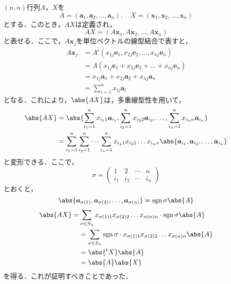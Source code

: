 \begin{tproof}
  $(n,n)$行列$A$，$X$を
  \[
    A = (\bm{a}_1 ,\bm{a}_2, \dots ,\bm{a}_n) , \quad X = (\bm{x}_1,\bm{x}_2,\dots,\bm{x}_n)
  \]
  とする．このとき，$AX$は定義され，
  \[
    AX = (A\bm{x}_1 , A\bm{x}_2 , \dots ,A\bm{x}_n)
  \]
  と表せる．ここで，$A \bm{x}_j$を単位ベクトルの線型結合で表すと，
  \begin{align*}
    A \bm{x}_j & = A {}^t (x_{1j} \bm{e}_1 , x_{2j} \bm{e}_2,\ldots ,x_{nj} \bm{e}_n ) \\
               & =A (x_{1j} \bm{e}_1 + x_{2j} \bm{e}_2+ \dots + x_{nj} \bm{e}_n)       \\
               & = x_{1j} \bm{a}_1 + x_{2j} \bm{a}_2 + x_{nj} \bm{a}_n                 \\
               & = \sum_{ i =1}^{n} x_{ij} \bm{a}_{i}
  \end{align*}
  となる．これにより，$\abs{AX}$は，多重線型性を用いて，
  \begin{align*}
    \abs{AX} & = \abs{\sum_{i_1 =1}^{n} x_{i_1 1} \bm{a}_{i_1} , \sum_{i_2 =1}^{n} x_{i_2 2} \bm{a}_{i_2},\ldots , \sum_{i_n =1}^{n} x_{i_n n} \bm{a}_{i_n} }        \\
             & = \sum_{i_1 =1}^{n} \sum_{i_2 = 1}^{n} \dots \sum_{i_n =1}^{n} x_{i_1 1} x_{i_2 2} \dots x_{i_n n} \abs{\bm{a}_{i_1},\bm{a}_{i_2},\dots,\bm{a}_{i_n}}
  \end{align*}
  と変形できる．ここで，
  \[
    \sigma = \begin{pmatrix} 1 & 2 & \cdots & n \\ i_1 & i_2 & \cdots & i_n \end{pmatrix}
  \]
  とおくと，
  \[
    \abs{\bm{a}_{\sigma (1)},\bm{a}_{\sigma(2)},\dots,\bm{a}_{\sigma(n)}} = \sgn \sigma \abs{A}
  \]
  \begin{align*}
    \abs{AX} = & \sum_{\sigma \in S_n} x_{\sigma (1)1} x_{\sigma(2)2} \dots x_{\sigma(n)n} \cdot \sgn \sigma  \abs{A}   \\
               & = \sum_{\sigma \in S_n } \sgn \sigma \cdot x_{\sigma(1)1} x_{\sigma(2)2} \dots x_{\sigma (n)n} \abs{A} \\
               & = \abs{{}^t X} \abs{A}                                                                                 \\
               & = \abs{A} \abs{X}
  \end{align*}
  を得る．これが証明すべきことであった．
\end{tproof}



